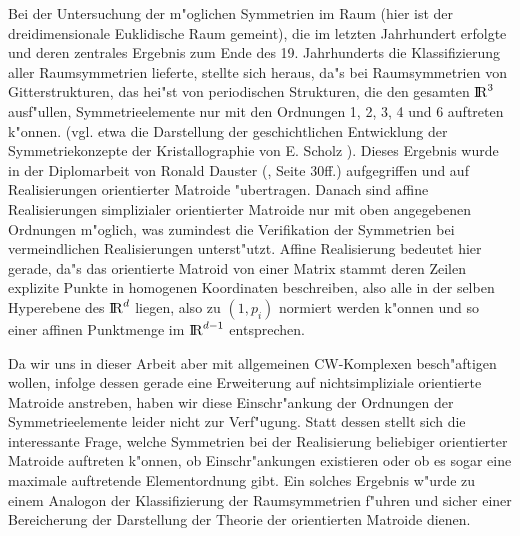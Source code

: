Bei der Untersuchung der m"oglichen Symmetrien im Raum (hier ist der
dreidimensionale Euklidische Raum gemeint), die im letzten Jahrhundert
erfolgte und deren zentrales Ergebnis zum Ende des 19. Jahrhunderts die
Klassifizierung aller Raumsymmetrien lieferte, stellte sich heraus, da"s bei
Raumsymmetrien von Gitterstrukturen, das hei"st von periodischen Strukturen,
die den gesamten $\mbox{$\rm I\!R$}^3$ ausf"ullen, Symmetrieelemente nur mit den Ordnungen
1, 2, 3, 4 und 6 auftreten k"onnen. (vgl. etwa die Darstellung der
geschichtlichen Entwicklung der Symmetriekonzepte der Kristallographie von E.
Scholz \cite{Scho:89}). Dieses Ergebnis wurde in der Diplomarbeit von Ronald
Dauster (\cite{Dau:89}, Seite 30ff.) aufgegriffen und auf Realisierungen
orientierter Matroide "ubertragen. Danach sind affine Realisierungen
simplizialer orientierter Matroide nur mit oben angegebenen Ordnungen m"oglich,
was zumindest die Verifikation der Symmetrien bei vermeindlichen Realisierungen
unterst"utzt. Affine Realisierung bedeutet hier gerade, da"s das orientierte
Matroid von einer Matrix stammt deren Zeilen explizite Punkte in homogenen
Koordinaten beschreiben, also alle in der selben Hyperebene des $\mbox{$\rm I\!R$}^d$ liegen,
also zu $(1,p_i)$ normiert werden k"onnen und so einer affinen Punktmenge
im $\mbox{$\rm I\!R$}^{d-1}$ entsprechen.

Da wir uns in dieser Arbeit aber mit allgemeinen CW-Komplexen besch"aftigen
wollen, infolge dessen gerade eine Erweiterung auf nichtsimpliziale orientierte
Matroide anstreben, haben wir diese Einschr"ankung der Ordnungen der
Symmetrieelemente leider nicht zur Verf"ugung. Statt dessen stellt sich die
interessante Frage, welche Symmetrien bei der Realisierung beliebiger orientierter
Matroide auftreten k"onnen, ob Einschr"ankungen existieren oder ob es sogar eine
maximale auftretende Elementordnung gibt. Ein solches Ergebnis w"urde zu einem
Analogon der Klassifizierung der Raumsymmetrien f"uhren und sicher einer
Bereicherung der Darstellung der Theorie der orientierten Matroide dienen.
